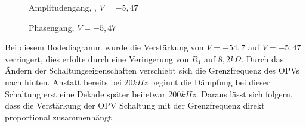 \begin{figure}[H]
  \centering
  \caption{Amplitudengang, , $V=-5,47$}
\end{figure}
\begin{figure}[H]
  \centering
  \caption{Phasengang, $V=-5,47$}
\end{figure}
\noindent
Bei diesem Bodediagramm wurde die Verst\"arkung von $V=-54,7$ auf $V=-5,47$ verringert, dies erfolte durch eine Veringerung von $R_1$ auf $8,2k\Omega$. Durch das \"Andern der Schaltungseigenschaften verschiebt sich die Grenzfrequenz des OPVs nach hinten. Anstatt bereits bei $20kHz$ beginnt die D\"ampfung bei dieser Schaltung erst eine Dekade sp\"ater bei etwar $200kHz$. Daraus l\"asst sich folgern, dass die Verst\"arkung der OPV Schaltung mit der Grenzfrequenz direkt proportional zusammenh\"angt.
